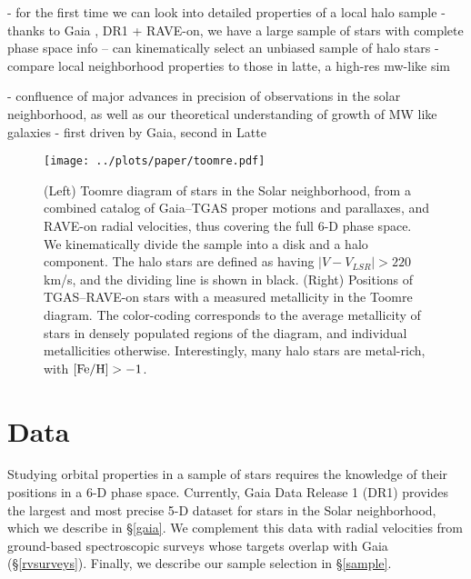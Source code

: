 \documentclass[apj, twocolappendix, numberedappendix, appendixfloats]{emulateapj}
\begin{document}
- for the first time we can look into detailed properties of a local halo sample
- thanks to Gaia \citep{perryman2001}, DR1 + RAVE-on, we have a large sample of stars with complete phase space info -- can kinematically select an unbiased sample of halo stars
- compare local neighborhood properties to those in latte, a high-res mw-like sim

- confluence of major advances in precision of observations in the solar neighborhood, as well as our theoretical understanding of growth of MW like galaxies
- first driven by Gaia, second in Latte


\begin{figure*}
\begin{center}
\texttt{[image: ../plots/paper/toomre.pdf]}
\caption{(Left) Toomre diagram of stars in the Solar neighborhood, from a combined catalog of Gaia--TGAS proper motions and parallaxes, and RAVE-on radial velocities, thus covering the full 6-D phase space.
We kinematically divide the sample into a disk and a halo component.
The halo stars are defined as having $|V-V_{LSR}|>220$\,km/s, and the dividing line is shown in black.
(Right) Positions of TGAS--RAVE-on stars with a measured metallicity in the Toomre diagram.
The color-coding corresponds to the average metallicity of stars in densely populated regions of the diagram, and individual metallicities otherwise.
Interestingly, many halo stars are metal-rich, with $\rm[Fe/H]>-1$.}
\label{fig:toomre}
\end{center}
\end{figure*}


\section{Data}
Studying orbital properties in a sample of stars requires the knowledge of their positions in a 6-D phase space.
Currently, Gaia Data Release 1 (DR1) provides the largest and most precise 5-D dataset for stars in the Solar neighborhood, which we describe in \S\ref{gaia}.
We complement this data with radial velocities from ground-based spectroscopic surveys whose targets overlap with Gaia (\S\ref{rvsurveys}).
Finally, we describe our sample selection in \S\ref{sample}.
\end{document}
